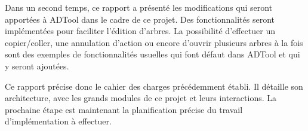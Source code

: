 	Dans un second temps, ce rapport a présenté les modifications qui seront apportées à ADTool dans le cadre de ce projet. Des fonctionnalités seront implémentées pour faciliter l'édition d'arbres. La possibilité d'effectuer un copier/coller, une annulation d'action ou encore d'ouvrir plusieurs arbres à la fois sont des exemples de fonctionnalités usuelles qui font défaut dans ADTool et qui y seront ajoutées.


	Ce rapport précise donc le cahier des charges précédemment établi. Il détaille son architecture, avec les grands modules de ce projet et leurs interactions. La prochaine étape est maintenant la planification précise du travail d'implémentation à effectuer.
